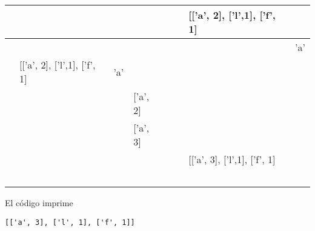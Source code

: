 \begin{center}
\begin{tabular}{|l|l|l|l|l|l|l|l|}
    \hline
    & & & & & & [['a', 2], ['l',1], ['f', 1] & \\
    \hline
    & & & & & & & 'a' \\
    \hline
    & [['a', 2], ['l',1], ['f', 1] & 'a' & & & & & \\
    \hline
    & & & ['a', 2] & & & & \\
    \hline
    & & & ['a', 3] & & & & \\
    \hline
    & & & & & & [['a', 3], ['l',1], ['f', 1] & \\
    \hline
    & & & & & & & \\
    \hline
    & & & & & & & \\
    \hline
    & & & & & & & \\
    \hline
    & & & & & & & \\
    \hline
    & & & & & & & \\
    \hline
\end{tabular}
\end{center}

El código imprime
\begin{lstlisting}[style=consola]
[['a', 3], ['l', 1], ['f', 1]]
\end{lstlisting}
